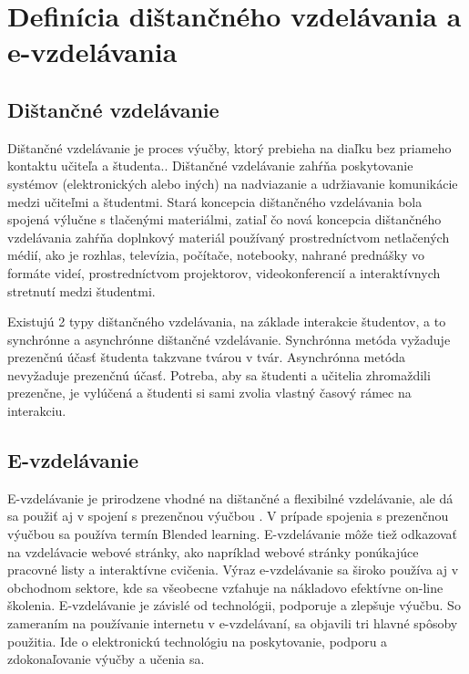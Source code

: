\documentclass[10pt,oneside,slovak,a4paper]{article}
\begin{document}
\section{Definícia dištančného vzdelávania a e-vzdelávania}
\label{rozdiely}
\subsection{Dištančné vzdelávanie}
Dištančné vzdelávanie je proces výučby, ktorý prebieha na diaľku bez priameho kontaktu učiteľa a študenta.\cite{India}. %
Dištančné vzdelávanie zahŕňa poskytovanie systémov (elektronických alebo iných) na nadviazanie a udržiavanie komunikácie medzi učiteľmi a študentmi.
Stará koncepcia dištančného vzdelávania bola spojená výlučne s tlačenými materiálmi, zatiaľ čo nová koncepcia dištančného vzdelávania zahŕňa doplnkový materiál používaný prostredníctvom netlačených médií, ako je rozhlas, televízia, počítače, notebooky, nahrané prednášky vo formáte videí, prostredníctvom projektorov, videokonferencií a interaktívnych stretnutí medzi študentmi.

Existujú 2 typy dištančného vzdelávania, na základe interakcie študentov, a to synchrónne a asynchrónne dištančné vzdelávanie. %
Synchrónna metóda vyžaduje prezenčnú účasť študenta takzvane tvárou v tvár. %
Asynchrónna metóda nevyžaduje prezenčnú účasť.
Potreba, aby sa študenti a učitelia zhromaždili prezenčne, je vylúčená a študenti si sami zvolia vlastný časový rámec na interakciu. %
\subsection{E-vzdelávanie}
E-vzdelávanie je prirodzene vhodné na dištančné a flexibilné vzdelávanie, ale dá sa použiť aj v spojení s prezenčnou výučbou \cite{elearningDef}. %
V prípade spojenia s prezenčnou výučbou sa používa termín Blended learning. %
E-vzdelávanie môže tiež odkazovať na vzdelávacie webové stránky, ako napríklad webové stránky ponúkajúce pracovné listy a interaktívne cvičenia.
Výraz e-vzdelávanie sa široko používa aj v obchodnom sektore, kde sa všeobecne vzťahuje na nákladovo efektívne on-line školenia.
E-vzdelávanie je závislé od technológii, podporuje a zlepšuje výučbu.
So zameraním na používanie internetu v e-vzdelávaní, sa objavili tri hlavné spôsoby použitia.
Ide o elektronickú technológiu na poskytovanie, podporu a zdokonaľovanie výučby a učenia sa. 
\end{document}
